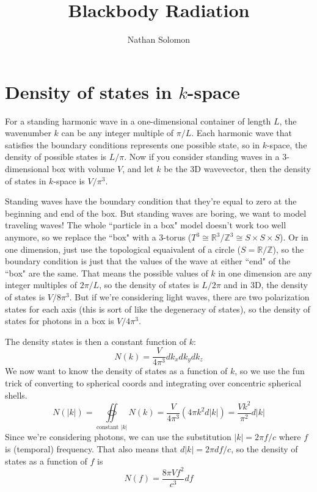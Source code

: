 \documentclass[12pt]{article}
\begin{document}
\title{Blackbody Radiation}
\author{Nathan Solomon}
\maketitle

\section{Density of states in $k$-space}
For a standing harmonic wave in a one-dimensional container of length $L$, the wavenumber $k$ can be any integer multiple of $\pi/L$. Each harmonic wave that satisfies the boundary conditions represents one possible state, so in $k$-space, the density of possible states is $L/\pi$. Now if you consider standing waves in a 3-dimensional box with volume $V$, and let $k$ be the 3D wavevector, then the density of states in $k$-space is $V/\pi^3$.

Standing waves have the boundary condition that they're equal to zero at the beginning and end of the box. But standing waves are boring, we want to model traveling waves! The whole ``particle in a box" model doesn't work too well anymore, so we replace the ``box" with a 3-torus ($T^3 \cong \mathbb{R}^3 / \mathbb{Z}^3 \cong S \times S \times S$). Or in one dimension, just use the topological equaivalent of a circle ($S = \mathbb{R} / \mathbb{Z}$), so the boundary condition is just that the values of the wave at either ``end" of the ``box" are the same. That means the possible values of $k$ in one dimension are any integer multiples of $2 \pi / L$, so the density of states is $L / 2 \pi$ and in 3D, the density of states is $V / 8 \pi^3$. But if we're considering light waves, there are two polarization states for each axis (this is sort of like the degeneracy of states), so the density of states for photons in a box is $V / 4 \pi^3$.

The density states is then a constant function of $k$:
\[N(k) = \frac{V}{4 \pi^3} dk_x dk_y dk_z\]
We now want to know the density of states as a function of $k$, so we use the fun trick of converting to spherical coords and integrating over concentric spherical shells.
\[N(|k|) = \oiint\limits_\text{constant $|k|$} N(k) = \frac{V}{4 \pi^3} (4 \pi k^2 d|k|) = \frac{V k^2}{\pi^2} d|k|\]
Since we're considering photons, we can use the substitution $|k| = 2 \pi f / c$ where $f$ is (temporal) frequency. That also means that $d|k| = 2 \pi df / c$, so the density of states as a function of $f$ is
\[N(f) = \frac{8 \pi V f^2}{c^3} df\]
\end{document}
